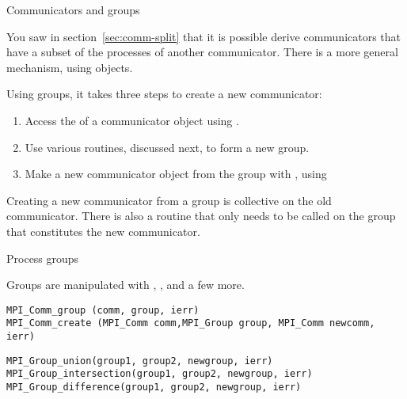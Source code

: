 
 {Communicators and groups}
\label{sec:mpi-comm-group}

You saw in section~\ref{sec:comm-split} that it is possible derive
communicators that have a subset of the processes of another communicator.
There is a more general mechanism, using 
objects.

Using groups, it takes three steps to create a new communicator:
\begin{enumerate}
\item Access the  of a communicator
  object using .
\item Use various routines, discussed next, to form a new group.
\item Make a new communicator object from the group with
  , using
\end{enumerate}

Creating a new communicator from a group is collective on the old communicator.
There is also a routine  that only
needs to be called on the group that constitutes the new communicator.

 {Process groups}
\label{sec:comm-group}

Groups are manipulated with
,
,
 and a few more.

\begin{lstlisting}
MPI_Comm_group (comm, group, ierr)
MPI_Comm_create (MPI_Comm comm,MPI_Group group, MPI_Comm newcomm, ierr)
\end{lstlisting}

\begin{lstlisting}
MPI_Group_union(group1, group2, newgroup, ierr)
MPI_Group_intersection(group1, group2, newgroup, ierr)
MPI_Group_difference(group1, group2, newgroup, ierr)
\end{lstlisting}

